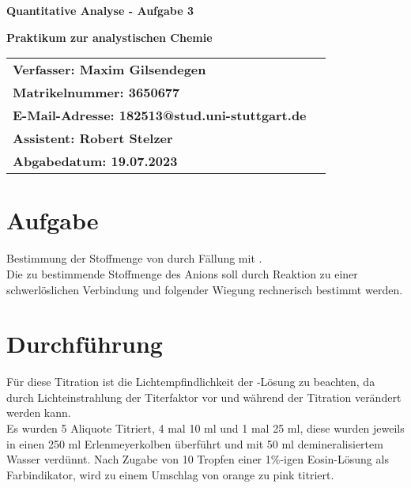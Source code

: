 \documentclass[12pt]{scrartcl} %
\begin{document}
\begin{titlepage}
\begin{center}
\vspace*{2cm}
\begin{LARGE}
\vspace*{1cm}
\textbf{\textsf{Quantitative Analyse - Aufgabe 3\\}}
\end{LARGE}
\vspace*{1cm}
\textbf{\textsf{Praktikum zur analystischen Chemie}}\\
\vspace*{1.5cm}
\begin{table}[H]
\sffamily
\hspace*{3cm}\begin{tabular}{>{\bfseries}l>{\bfseries}l}
Verfasser: Maxim Gilsendegen\\
Matrikelnummer: 3650677\\
E-Mail-Adresse: 182513@stud.uni-stuttgart.de\\
Assistent: Robert Stelzer\\
Abgabedatum: 19.07.2023\\
\end{tabular}
\end{table}
\end{center}
\end{titlepage}
\renewcommand{\thepage}{\Roman{page}}\setcounter{page}{1}
\tableofcontents %
\newpage
\renewcommand{\thepage}{\arabic{page}}\setcounter{page}{1}

\section{Aufgabe}
Bestimmung der Stoffmenge von  durch Fällung mit .\\
Die zu bestimmende Stoffmenge des Anions soll durch Reaktion zu einer schwerlöslichen Verbindung  und folgender Wiegung rechnerisch bestimmt werden.

\section{Durchführung}
Für diese Titration ist die Lichtempfindlichkeit der -Lösung zu beachten, da durch Lichteinstrahlung der Titerfaktor vor und während der Titration verändert werden kann.\\
Es wurden 5 Aliquote Titriert, 4 mal 10 ml und 1 mal 25 ml, diese wurden jeweils in einen 250 ml Erlenmeyerkolben überführt und mit 50 ml demineralisiertem Wasser verdünnt. Nach Zugabe von 10 Tropfen einer 1\%-igen Eosin-Lösung als Farbindikator, wird zu einem Umschlag von orange zu pink titriert.
\end{document}
